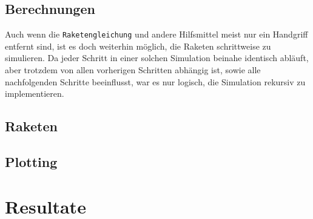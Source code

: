\documentclass[11pt]{article}
\begin{document}
\subsection{Berechnungen}
\label{sec:orge9cac3b}
Auch wenn die \texttt{Raketengleichung} und andere Hilfsmittel meist nur ein Handgriff
entfernt sind, ist es doch weiterhin möglich, die Raketen schrittweise zu
simulieren. Da jeder Schritt in einer solchen Simulation beinahe identisch
abläuft, aber trotzdem von allen vorherigen Schritten abhängig ist, sowie alle
nachfolgenden Schritte beeinflusst, war es nur logisch, die Simulation rekursiv
zu implementieren.
\subsection{Raketen}
\label{sec:org655e6eb}
\subsection{Plotting}
\label{sec:org4d35381}
\section{Resultate}
\label{sec:org18d95f2}
\end{document}

